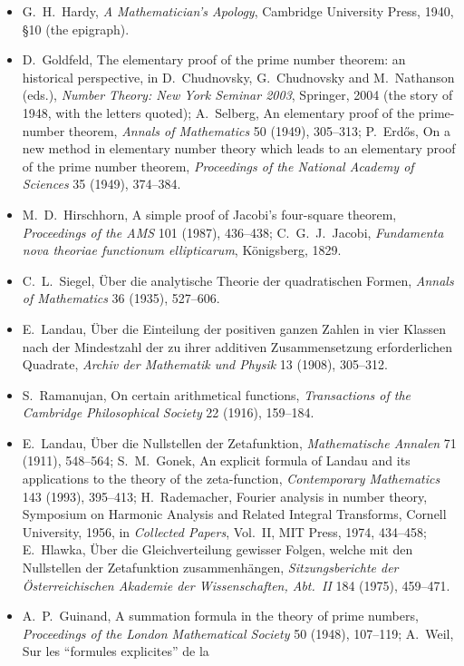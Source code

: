 \begin{itemize}
\item G.~H.~Hardy, \emph{A Mathematician's Apology}, Cambridge University Press, 1940, \S10 (the epigraph).
\item D.~Goldfeld, The elementary proof of the prime number theorem: an historical perspective, in D.~Chudnovsky, G.~Chudnovsky and M.~Nathanson (eds.), \emph{Number Theory: New York
Seminar 2003}, Springer, 2004 (the story of 1948, with the letters quoted); A.~Selberg, An elementary proof of the prime-number theorem, \emph{Annals of Mathematics} 50 (1949),
305--313; P.~Erd\H os, On a new method in elementary number theory which leads to an elementary proof of the prime number theorem, \emph{Proceedings of the National Academy of
Sciences} 35 (1949), 374--384.
\item M.~D.~Hirschhorn, A simple proof of Jacobi's four-square theorem, \emph{Proceedings of the AMS} 101 (1987), 436--438; C.~G.~J.~Jacobi, \emph{Fundamenta nova theoriae functionum
ellipticarum}, Königsberg, 1829.
\item C.~L.~Siegel, Über die analytische Theorie der quadratischen Formen, \emph{Annals of Mathematics} 36 (1935), 527--606.
\item E.~Landau, Über die Einteilung der positiven ganzen Zahlen in vier Klassen nach der Mindestzahl der zu ihrer additiven Zusammensetzung erforderlichen Quadrate, \emph{Archiv der
Mathematik und Physik} 13 (1908), 305--312.
\item S.~Ramanujan, On certain arithmetical functions, \emph{Transactions of the Cambridge Philosophical Society} 22 (1916), 159--184.
\item E.~Landau, Über die Nullstellen der Zetafunktion, \emph{Mathematische Annalen} 71 (1911), 548--564; S.~M.~Gonek, An explicit formula of Landau and its applications to the theory of the
zeta-function, \emph{Contemporary Mathematics} 143 (1993), 395--413; H.~Rademacher, Fourier analysis in number theory, Symposium on Harmonic Analysis and Related Integral Transforms,
Cornell University, 1956, in \emph{Collected Papers}, Vol.~II, MIT Press, 1974, 434--458; E.~Hlawka, Über die Gleichverteilung gewisser Folgen, welche mit den Nullstellen der
Zetafunktion zusammenhängen, \emph{Sitzungsberichte der Österreichischen Akademie der Wissenschaften, Abt.~II} 184 (1975), 459--471.
\item A.~P.~Guinand, A summation formula in the theory of prime numbers, \emph{Proceedings of the London Mathematical Society} 50 (1948), 107--119; A.~Weil, Sur les ``formules explicites'' de la

\end{itemize}
